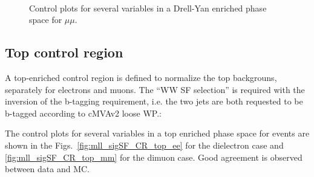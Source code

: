 \begin{figure}[h]
\\

\caption{Control plots for several variables in a Drell-Yan enriched phase space for $\mu \mu$.}
    \label{fig:mll_sigSF_CR_DY_mm}
\end{figure}

\newpage
\clearpage
\subsection*{Top control region}
A top-enriched control region is defined to normalize the top backgrouns,
separately for electrons and muons.
The ``WW SF selection'' is required with the inversion of the b-tagging
requirement, i.e. the two jets are both requested to be b-tagged according to
cMVAv2 loose WP.:

The control plots for several variables in a top enriched phase space for events are shown in
the Figs.~\ref{fig:mll_sigSF_CR_top_ee} for the dielectron case and
\ref{fig:mll_sigSF_CR_top_mm} for the dimuon case. Good agreement is observed
between data and MC.


